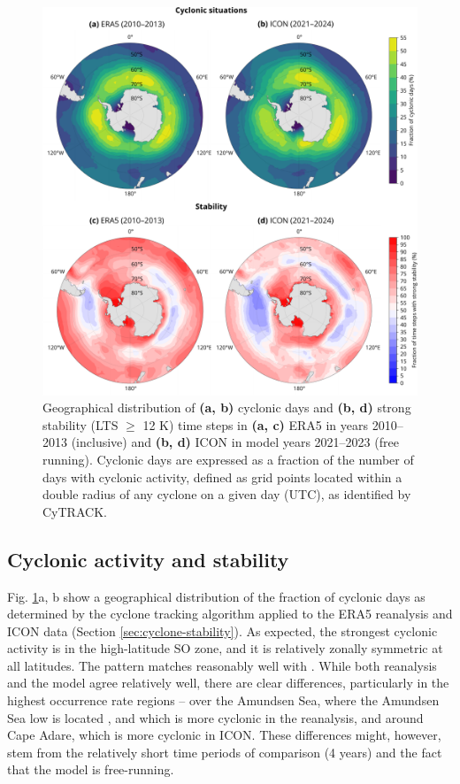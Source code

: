 \documentclass[draft]{agujournal2019}
\begin{document}
\begin{figure}[p!]
\centering
\includegraphics[width=\textwidth]{img/cyc_stab_dist.pdf}
\caption{
Geographical distribution of \textbf{(a, b)} cyclonic days and \textbf{(b, d)} strong stability (LTS $\geq$ 12 K) time steps in \textbf{(a, c)} ERA5 in years 2010--2013 (inclusive) and \textbf{(b, d)} ICON in model years 2021--2023 (free running). Cyclonic days are expressed as a fraction of the number of days with cyclonic activity, defined as grid points located within a double radius of any cyclone on a given day (UTC), as identified by CyTRACK.
}
\label{fig:cyclone-stability}
\end{figure}

\subsection{Cyclonic activity and stability}

Fig. \ref{fig:cyclone-stability}a, b show a geographical distribution of the fraction of cyclonic days as determined by the cyclone tracking algorithm applied to the ERA5 reanalysis and ICON data (Section \ref{sec:cyclone-stability}). As expected, the strongest cyclonic activity is in the high-latitude SO zone, and it is relatively zonally symmetric at all latitudes. The pattern matches reasonably well with . While both reanalysis and the model agree relatively well, there are clear differences, particularly in the highest occurrence rate regions -- over the Amundsen Sea, where the Amundsen Sea low is located \cite{turner2013}, and which is more cyclonic in the reanalysis, and around Cape Adare, which is more cyclonic in ICON. These differences might, however, stem from the relatively short time periods of comparison (4 years) and the fact that the model is free-running.
\end{document}
